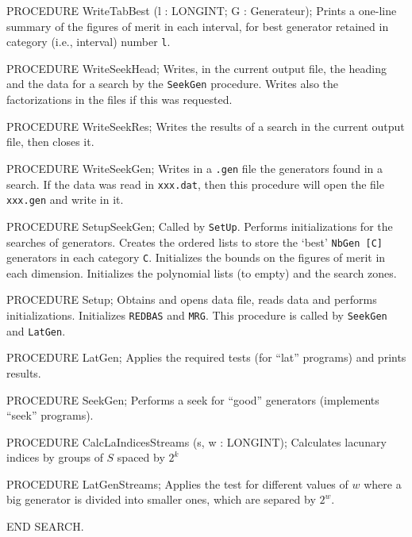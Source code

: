 PROCEDURE WriteTabBest (l : LONGINT;  G : Generateur);
\endcode
 \tab
  Prints a one-line summary of the figures of merit in each interval,
  for best generator retained in category (i.e., interval) number {\tt l}.
 \endtab
\code

PROCEDURE WriteSeekHead;
\endcode
 \tab
  Writes, in the current output file, the heading and the data 
  for a search by the {\tt SeekGen} procedure.
  Writes also the factorizations in the files if this was requested.
 \endtab
\code 

PROCEDURE WriteSeekRes;
\endcode
 \tab
   Writes the results of a search in the current output file,
   then closes it.
 \endtab
\code

PROCEDURE WriteSeekGen;
\endcode
 \tab
   Writes in a {\tt .gen} file the generators found in a search.
   If the data was read in {\tt xxx.dat}, then this procedure
   will open the file {\tt xxx.gen} and write in it.
 \endtab
\code

PROCEDURE SetupSeekGen;
\endcode
 \tab
  Called by {\tt SetUp}.
  Performs initializations for the searches of generators.
  Creates the ordered lists to store the `best' {\tt NbGen [C]}
  generators in each category {\tt C}.
  Initializes the bounds on the figures of merit in each dimension.
  Initializes the polynomial lists (to empty) and the search zones.
 \endtab
\code

PROCEDURE Setup;
\endcode
 \tab
  Obtains and opens data file, reads data and performs initializations.
  Initializes {\tt REDBAS} and {\tt MRG}.
  This procedure is called by {\tt SeekGen} and {\tt LatGen}.
 \endtab
\code

PROCEDURE LatGen;
\endcode
 \tab  Applies the required tests 
   (for ``lat'' programs) and prints results.
 \endtab
\code

PROCEDURE SeekGen;
\endcode
 \tab  Performs a seek for ``good'' generators 
   (implements ``seek'' programs).
 \endtab
\code

PROCEDURE CalcLaIndicesStreams (s, w : LONGINT);
\endcode
 \tab Calculates lacunary indices by groups of $S$ spaced by $2^k$
 \endtab 
\code

PROCEDURE LatGenStreams;
\endcode
 \tab  Applies the test for different values of $w$ where a big generator
  is divided into smaller ones, which are separed by $2^w$. 
 \endtab 
\code 

END SEARCH.
\endcode








